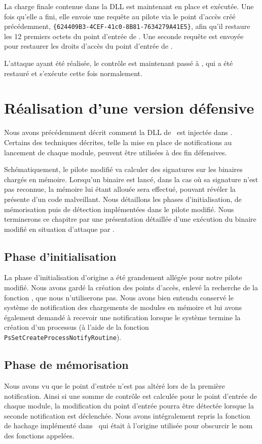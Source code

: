 La charge finale contenue dans la DLL est maintenant en place et exécutée.
Une fois qu'elle a fini, elle envoie une requête au pilote via le point d'accès créé précédemment, \texttt{\{624409B3-4CEF-41c0-8B81-7634279A41E5\}}, afin qu'il restaure les 12 premiers octets du point d'entrée de \services.
Une seconde requête est envoyée pour restaurer les droits d'accès du point d'entrée de \services.

L'attaque ayant été réalisée, le contrôle est maintenant passé à \services, qui a été restauré et s'exécute cette fois normalement.

\section{Réalisation d'une version défensive}
Nous avons précédemment décrit comment la DLL de \duqu\ est injectée dans \services.
Certains des techniques décrites, telle la mise en place de notifications au lancement de chaque module, peuvent être utilisées à des fin défensives.

Schématiquement, le pilote modifié va calculer des signatures sur les binaires chargés en mémoire.
Lorsqu'un binaire est lancé, dans la cas où sa signature n'est pas reconnue, la mémoire lui étant allouée sera effectué, pouvant révéler la présente d'un code malveillant.
Nous détaillons les phases d'initialisation, de mémorisation puis de détection implémentées dans le pilote modifié.
Nous terminerons ce chapitre par une présentation détaillée d'une exécution du binaire modifié en situation d'attaque par \duqu.

\subsection{Phase d'initialisation}
La phase d'initialisation d'origine a été grandement allégée pour notre pilote modifié.
Nous avons gardé la création des points d'accès, enlevé la recherche de la fonction \ZwP, que nous n'utiliserons pas.
Nous avons bien entendu conservé le système de notification des chargements de modules en mémoire et lui avons également demandé à recevoir une notification lorsque le système termine la création d'un processus (à l'aide de la fonction \texttt{PsSetCreateProcessNotifyRoutine}).

\subsection{Phase de mémorisation}
Nous avons vu que le point d'entrée n'est pas altéré lors de la première notification.
Ainsi si une somme de contrôle est calculée pour le point d'entrée de chaque module, la modification du point d'entrée pourra être détectée lorsque la seconde notification est déclenchée.
Nous avons intégralement repris la fonction de hachage implémenté dans \duqu\ qui était à l'origine utilisée pour obscurcir le nom des fonctions appelées.

